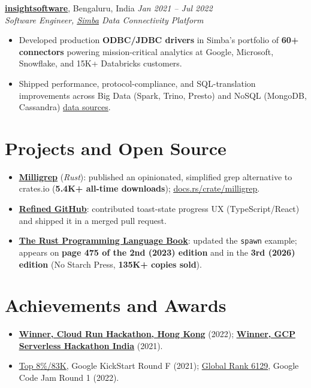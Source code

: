 \documentclass[11pt,letterpaper]{article}
\let\oldhref\href
\renewcommand{\href}[2]{\oldhref{#1}{\uline{#2}}}
\begin{document}
\textbf{\href{https://insightsoftware.com/}{insightsoftware}}, Bengaluru, India \hfill \textit{Jan 2021 -- Jul 2022}\\
\textit{Software Engineer, \href{https://insightsoftware.com/simba/}{Simba} Data Connectivity Platform}
\begin{itemize}
\item Developed production \textbf{ODBC/JDBC drivers} in Simba's portfolio of \textbf{60+ connectors} powering mission-critical analytics at Google, Microsoft, Snowflake, and 15K+ Databricks customers.
\item Shipped performance, protocol-compliance, and SQL-translation improvements across Big Data (Spark, Trino, Presto) and NoSQL (MongoDB, Cassandra) \href{https://insightsoftware.com/drivers/}{data sources}.
\end{itemize}

\section{Projects and Open Source}
\begin{itemize}
\item \textbf{\href{https://crates.io/crates/milligrep}{Milligrep}} (\textit{Rust}): published an opinionated, simplified grep alternative to crates.io (\textbf{5.4K+ all-time downloads}); \href{https://docs.rs/crate/milligrep/}{docs.rs/crate/milligrep}.
\item \textbf{\href{https://github.com/sindresorhus/refined-github/pull/4686}{Refined GitHub}}: contributed toast-state progress UX (TypeScript/React) and shipped it in a merged pull request.
\item \textbf{\href{https://github.com/rust-lang/book/pull/2709}{The Rust Programming Language Book}}: updated the \texttt{spawn} example; appears on \textbf{page 475 of the 2nd (2023) edition} and in the \textbf{3rd (2026) edition} (No Starch Press, \textbf{135K+ copies sold}).
\end{itemize}

\section{Achievements and Awards}
\begin{itemize}
\item \textbf{\href{https://drive.google.com/file/d/1a7gMuyT5tpdBcb7lU-z9tAuhi4A9U7Th/view?usp=sharing}{Winner, Cloud Run Hackathon, Hong Kong}} (2022); \textbf{\href{https://www.linkedin.com/posts/jayeshmann_google-cloud-india-activity-6869962807044014080-ASa5}{Winner, GCP Serverless Hackathon India}} (2021).
\item \href{https://drive.google.com/file/d/1P-YaEEqjyIRV_zb-uGZrVbMufpPWe1ax/view?usp=sharing}{Top 8\%/83K}, Google KickStart Round F (2021); \href{https://drive.google.com/file/d/1NzuTVfUnyHpv9tqIiTcS1wZPZ0WbzhiI/view?usp=sharing}{Global Rank 6129}, Google Code Jam Round 1 (2022).
\end{itemize}
\end{document}
